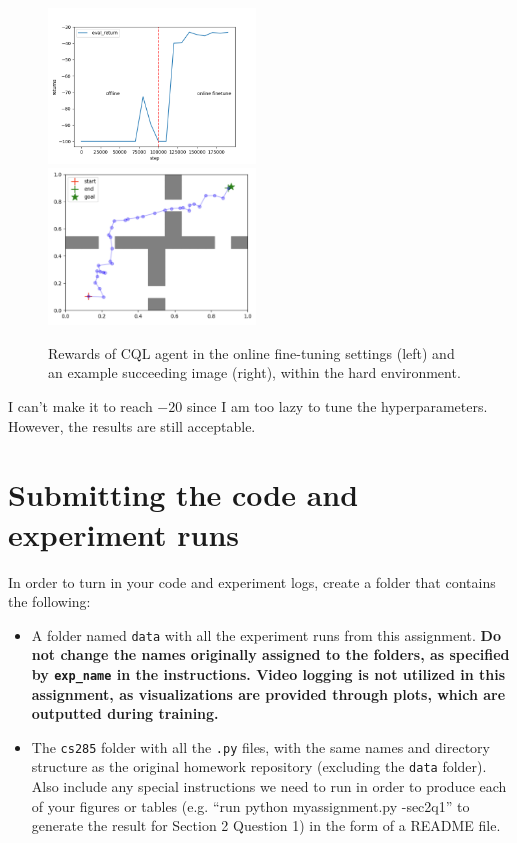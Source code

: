 \documentclass{article}
\begin{document}
\begin{figure}[H]
    \centering
    \includegraphics[width=0.49\textwidth]{../report/assets/5.png}~
    \includegraphics[width=0.49\textwidth]{../report/assets/5-example.png}
    \caption{Rewards of CQL agent in the online fine-tuning settings (left) and an example succeeding image (right), within the hard environment.}
\end{figure}

I can't make it to reach $-20$ since I am too lazy to tune the hyperparameters. However, the results are still acceptable.

\section{Submitting the code and experiment runs}
In order to turn in your code and experiment logs, create a folder that contains the following: 
\begin{itemize}
    \item A folder named \texttt{data} with all the experiment runs from this assignment.
    \textbf{Do not change the names originally assigned to the folders, as specified by  \texttt{exp\_name} in the instructions. Video logging is not utilized in this assignment, as visualizations are provided through plots, which are outputted during training.}
    \item The \texttt{cs285} folder with all the \texttt{.py} files, with the same names and directory structure as the original homework repository (excluding the \texttt{data} folder). Also include any special instructions we need to run in order to produce each of your figures or tables (e.g. ``run python myassignment.py -sec2q1'' to generate the result for Section 2 Question 1) in the form of a README file.
\end{itemize}
\end{document}
